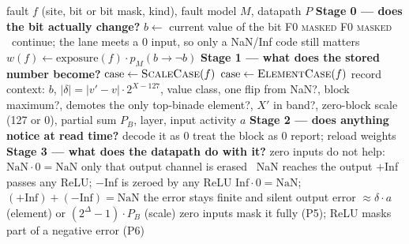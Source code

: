 \documentclass[10pt,a4paper]{article}
\begin{document}
\begin{algorithm}[p]
\caption{\textsc{Assess}: what one fault does}
\label{alg:assess}
\small
\begin{algorithmic}[1]
\Require fault $f$ (site, bit or bit mask, kind), fault model $M$, datapath $P$
\Statex \textbf{Stage 0 --- does the bit actually change?}
\State $b \gets$ current value of the bit
 \Return F0 \textsc{masked} \EndIf
{}
    \Return F0 \textsc{masked}
   \Else\ continue; the lane meets a 0 input, so only a NaN/Inf code still matters
   \EndIf
\EndIf
\State $w(f) \gets \text{exposure}(f)\cdot p_M(b \to \lnot b)$
\Statex \textbf{Stage 1 --- what does the stored number become?}
 \State $\text{case} \gets \textsc{ScaleCase}(f)$ 
\Else \State $\text{case} \gets \textsc{ElementCase}(f)$ 
\EndIf
\State record context: $b$, $|\delta| = |v'-v|\cdot 2^{X-127}$, value class, one flip from NaN?,
       block maximum?, demotes the only top-binade element?, $X'$ in band?, zero-block scale
       (127 or 0), partial sum $P_B$, layer, input activity $a$
\Statex \textbf{Stage 2 --- does anything notice at read time?}
 
    decode it as 0 \EndIf
\EndIf
{} 
    treat the block as 0 \EndIf
\EndIf
{} report; reload weights \EndIf
\Statex \textbf{Stage 3 --- what does the datapath do with it?}
   \State zero inputs do not help: $\text{NaN}\cdot 0=\text{NaN}$
    only that output channel is erased 
   \Else\ NaN reaches the output 
   \EndIf
{}
   \State $+$Inf passes any ReLU; $-$Inf is zeroed by any ReLU 
   \State $\text{Inf}\cdot 0 = \text{NaN}$; $(+\text{Inf}) + (-\text{Inf}) = \text{NaN}$
    the error stays finite and silent \EndIf
\Else
   \State output error $\approx \delta\cdot a$ (element) or $(2^{\Delta}-1)\cdot P_B$ (scale)
   \State zero inputs mask it fully (P5); ReLU masks part of a negative error (P6)
\EndIf

\end{algorithmic}
\end{algorithm}
\end{document}
